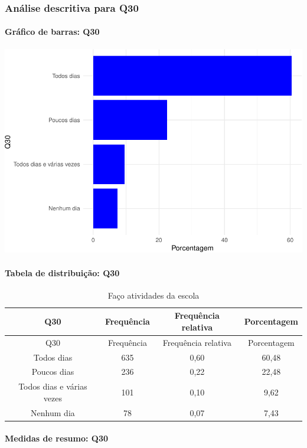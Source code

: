 \documentclass[]{article}
\let\oldparagraph\paragraph
\renewcommand{\paragraph}[1]{\oldparagraph{#1}\mbox{}}
\begin{document}
\hypertarget{anuxe1lise-descritiva-para-q30}{%
\subsubsection{Análise descritiva para Q30}\label{anuxe1lise-descritiva-para-q30}}

\hypertarget{gruxe1fico-de-barras-q30}{%
\paragraph{Gráfico de barras: Q30}\label{gruxe1fico-de-barras-q30}}

\begin{center}\includegraphics[width=0.75\linewidth]{relatorio_covid19_files/figure-latex/unnamed-chunk-953-1} \end{center}

\hypertarget{tabela-de-distribuiuxe7uxe3o-q30}{%
\paragraph{Tabela de distribuição: Q30}\label{tabela-de-distribuiuxe7uxe3o-q30}}

\begin{longtable}[]{@{}cccc@{}}
\caption{\label{tab:unnamed-chunk-954}Faço atividades da escola}\tabularnewline
\toprule
Q30 & Frequência & Frequência relativa & Porcentagem\tabularnewline
\midrule
\endfirsthead
\toprule
Q30 & Frequência & Frequência relativa & Porcentagem\tabularnewline
\midrule
\endhead
Todos dias & 635 & 0,60 & 60,48\tabularnewline
Poucos dias & 236 & 0,22 & 22,48\tabularnewline
Todos dias e várias vezes & 101 & 0,10 & 9,62\tabularnewline
Nenhum dia & 78 & 0,07 & 7,43\tabularnewline
\bottomrule
\end{longtable}

\hypertarget{medidas-de-resumo-q30}{%
\paragraph{Medidas de resumo: Q30}\label{medidas-de-resumo-q30}}
\end{document}

